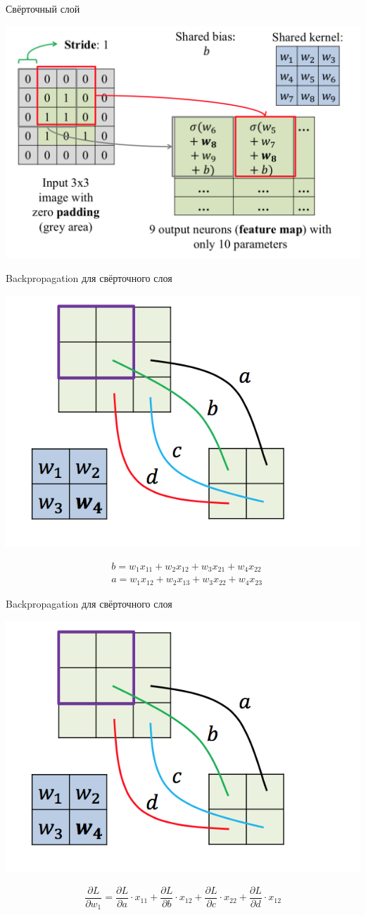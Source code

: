 \documentclass[notes,12pt, aspectratio=169]{beamer}
\begin{document}
\begin{frame}{Свёрточный слой}
\begin{center}
	\includegraphics[width=.7\linewidth]{conv_layer_2.png}
\end{center}
\end{frame}

\begin{frame}{Backpropagation для свёрточного слоя}
\begin{center}
 \includegraphics[width=.4\linewidth]{back_cl1.png}
\end{center}

\begin{equation*}
\begin{aligned}
& b = w_1 x_{11} + w_2 x_{12} + w_3 x_{21} + w_4 x_{22} \\
& a = w_1 x_{12} + w_2 x_{13} + w_3 x_{22} + w_4 x_{23} 
\end{aligned}
\end{equation*}
\end{frame}


\begin{frame}{Backpropagation для свёрточного слоя}
\begin{center}
	\includegraphics[width=.4\linewidth]{back_cl1.png}
\end{center}

\[
\frac{\partial L}{\partial w_1} = \frac{ \partial L }{\partial a} \cdot x_{11} + \frac{ \partial L }{\partial b} \cdot x_{12} + \frac{ \partial L }{\partial c} \cdot x_{22}  + \frac{ \partial L }{\partial d} \cdot x_{12} 
\]
\end{frame}
\end{document}
